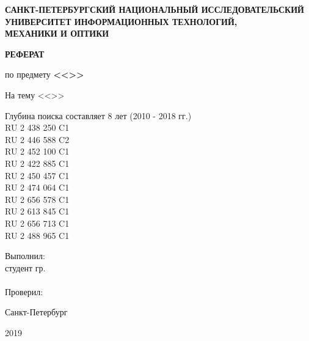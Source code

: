 \thispagestyle{empty}


\begin{center}
\textbf{САНКТ-ПЕТЕРБУРГСКИЙ НАЦИОНАЛЬНЫЙ ИССЛЕДОВАТЕЛЬСКИЙ\\ УНИВЕРСИТЕТ ИНФОРМАЦИОННЫХ ТЕХНОЛОГИЙ, \\МЕХАНИКИ И ОПТИКИ}
\end{center}


\vfill

\begin{center}
	\textbf{РЕФЕРАТ}
	
	по предмету \textbf{<<\Subject>>}
	
	На тему <<\Theme>>
\end{center}

\vfill

\begin{flushleft}
	Глубина поиска составляет 8 лет (2010 - 2018 гг.)\\
	
	RU 2 438 250 C1 \\
	RU 2 446 588 C2 \\
	RU 2 452 100 C1 \\
	RU 2 422 885 C1 \\
	RU 2 450 457 C1 \\
	RU 2 474 064 C1 \\ 
	RU 2 656 578 C1 \\
	RU 2 613 845 C1 \\
	RU 2 656 713 C1 \\
	RU 2 488 965 C1


\end{flushleft}

\vfill

\begin{flushright}
	Выполнил:\\
	студент гр. \Group\\
	\FullName\\
	
	Проверил:\\
	\Teacher
\end{flushright}

\vfill

\begin{center}
	Санкт-Петербург
	
	2019
\end{center}